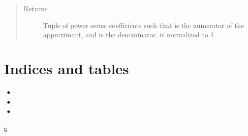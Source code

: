 \documentclass[letterpaper,10pt,english]{sphinxmanual}
\begin{document}
\begin{fulllineitems}
\begin{quote}
\begin{description}
\begin{itemize}
\end{itemize}

\item[{Returns}] \leavevmode
Tuple of power series coefficients  such that
 is the numerator of the approximant,
and  is the denominator.  is
normalized to 1.

\end{description}\end{quote}

\end{fulllineitems}



\chapter{Indices and tables}
\label{\detokenize{index:indices-and-tables}}\begin{itemize}
\item {} 

\item {} 

\item {} 

\end{itemize}


\renewcommand{\indexname}{Python Module Index}
\begin{sphinxtheindex}
\def\bigletter#1{{\Large\sffamily#1}\nopagebreak\vspace{1mm}}
\bigletter{g}
\item {}
\end{sphinxtheindex}

\renewcommand{\indexname}{Index}
\printindex
\end{document}
